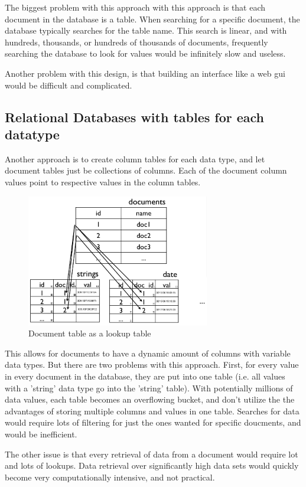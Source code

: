 The biggest problem with this approach with this approach is that each document
in the database is a table. When searching for a specific document, the database 
typically searches for the table name. This search is linear, and with hundreds,
thousands, or hundreds of thousands of documents, frequently searching the database
to look for values would be infinitely slow and useless.

Another problem with this design, is that building an interface like a web gui would
be difficult and complicated. 


\subsection{Relational Databases with tables for each datatype}
Another approach is to create column tables for each data type, and let document 
tables just be collections of columns. Each of the document column values point to 
respective values in the column tables.

\begin{figure}[h]
	\begin{center}
	\includegraphics[width=80mm]{images/rel_db_lookup}
	\caption{Document table as a lookup table} 
	\label{rel_db_lookup}
	\end{center}
\end{figure}

This allows for documents to have a dynamic amount of columns with variable data types.
But there are two problems with this approach. First, for every value in every document
in the database, they are put into one table (i.e. all values with a 'string' data type
go into the 'string' table). With potentially millions of data values, each table
becomes an overflowing bucket, and don't utilize the the advantages of storing multiple
columns and values in one table. Searches for data would require lots of filtering 
for just the ones wanted for specific doucments, and would be inefficient.

The other issue is that every retrieval of data from a document would require lot and 
lots of lookups. Data retrieval over significantly high data sets would quickly become
very computationally intensive, and not practical.
